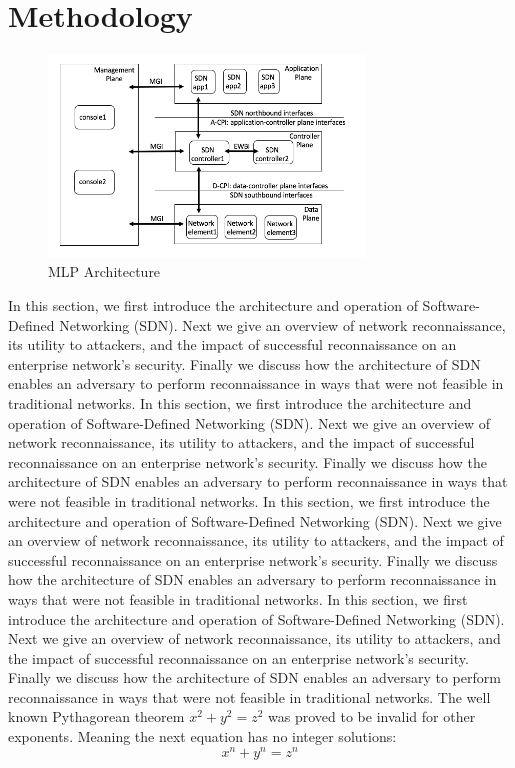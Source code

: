 \section{Methodology}

\begin{figure}[t]
  \centering 
  \includegraphics[width=3.3in]{img/MLP.png} 
  \caption{MLP Architecture} 
  \label{fig:MLP} 
\end{figure}

In this section, we first introduce the architecture and operation of
Software-Defined Networking (SDN). Next we give an overview of network 
reconnaissance, its utility to attackers, and the impact of successful
reconnaissance on an enterprise network's security. Finally  we discuss
how the architecture of SDN enables an adversary to perform reconnaissance 
in ways that were not feasible in traditional networks. 
In this section, we first introduce the architecture and operation of
Software-Defined Networking (SDN). Next we give an overview of network 
reconnaissance, its utility to attackers, and the impact of successful
reconnaissance on an enterprise network's security. Finally  we discuss
how the architecture of SDN enables an adversary to perform reconnaissance 
in ways that were not feasible in traditional networks. 
In this section, we first introduce the architecture and operation of
Software-Defined Networking (SDN). Next we give an overview of network 
reconnaissance, its utility to attackers, and the impact of successful
reconnaissance on an enterprise network's security. Finally  we discuss
how the architecture of SDN enables an adversary to perform reconnaissance 
in ways that were not feasible in traditional networks. 
In this section, we first introduce the architecture and operation of
Software-Defined Networking (SDN). Next we give an overview of network 
reconnaissance, its utility to attackers, and the impact of successful
reconnaissance on an enterprise network's security. Finally  we discuss
how the architecture of SDN enables an adversary to perform reconnaissance 
in ways that were not feasible in traditional networks. 
The well known Pythagorean theorem \(x^2 + y^2 = z^2\) was 
proved to be invalid for other exponents. 
Meaning the next equation has no integer solutions:
\[ x^n + y^n = z^n \]

